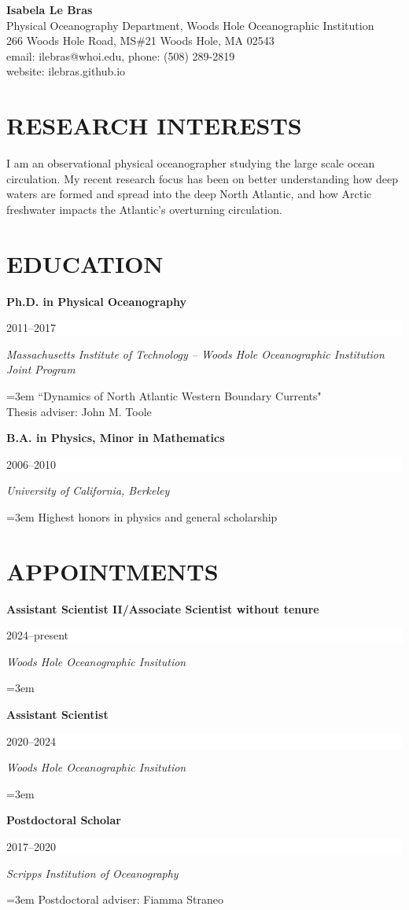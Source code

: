 \documentclass[paper=letter,fontsize=11pt]{scrartcl} %
\newcommand{\sepspace}{\vspace*{3mm}}		%
\newcommand{\NewPart}[2]{\section*{\uppercase{#1} #2}}
\newcommand{\EducationEntry}[4]{
		\noindent \textbf{#1} \hfill      %
		\colorbox{White}{%
			\parbox{8em}{%
			\hfill\color{Black}#2}} \par  %
		\noindent \textit{#3} \par        %
		\noindent\hangindent=3em\hangafter=0 #4 %
		 \par}
\begin{document}


\begin{center}
\Large{\textbf{Isabela Le Bras}}\\
\normalsize{
Physical Oceanography Department, Woods Hole Oceanographic Institution\\
266 Woods Hole Road, MS\#21 Woods Hole, MA 02543\\
email: ilebras@whoi.edu, phone: (508) 289-2819\\
website: ilebras.github.io
}
\end{center}


\NewPart{Research Interests}{}
I am an observational physical oceanographer studying the large scale ocean circulation. My recent research focus has been on better understanding how deep waters are formed and spread into the deep North Atlantic, and how Arctic freshwater impacts the Atlantic's overturning circulation.

\NewPart{Education}{}

\EducationEntry{Ph.D. in Physical Oceanography}{2011--2017}{Massachusetts Institute of Technology -- Woods Hole Oceanographic Institution Joint Program}{``Dynamics of North Atlantic Western Boundary Currents"\\
Thesis adviser: John M. Toole}
\sepspace

\EducationEntry{B.A. in Physics, Minor in Mathematics}{2006--2010}{University of California, Berkeley}{Highest honors in physics and general scholarship}

\NewPart{Appointments}{}

\EducationEntry{{Assistant Scientist II/Associate Scientist without tenure}}{2024--present}{Woods Hole Oceanographic Insitution}{}

\EducationEntry{{Assistant Scientist}}{2020--2024}{Woods Hole Oceanographic Insitution}{}


\EducationEntry{{Postdoctoral Scholar}}{2017--2020}{Scripps Institution of Oceanography}{Postdoctoral adviser: Fiamma Straneo}
\end{document}
